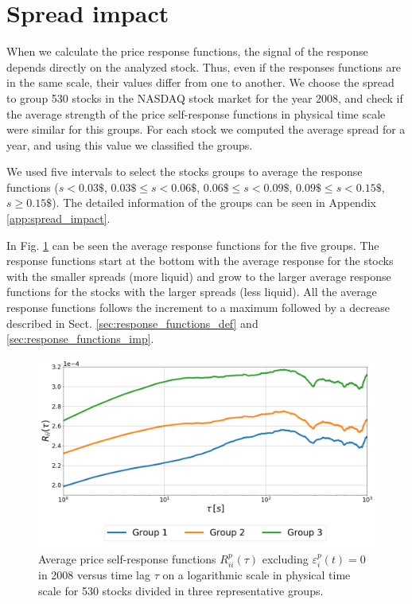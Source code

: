 \section{Spread impact}\label{sec:spread_impact}

When we calculate the price response functions, the signal of the response depends
directly on the analyzed stock. Thus, even if the responses functions are in
the same scale, their values differ from one to another. We choose the spread
to group 530 stocks in the NASDAQ stock market for the year 2008, and check if
the average strength of the price self-response functions in physical time scale were
similar for this groups. For each stock we computed the average spread for a
year, and using this value we classified the groups.

We used five intervals to select the stocks groups to average the response
functions ($s<0.03\$$, $0.03\$ \le s <0.06\$$, $0.06\$ \le s <0.09\$$,
$0.09\$ \le s <0.15\$$, $s \ge 0.15\$$). The detailed information of the groups
can be seen in Appendix \ref{app:spread_impact}.

In Fig. \ref{fig:spread_impact} can be seen the average response functions for
the five groups. The response functions start at the bottom with the average
response for the stocks with the smaller spreads (more liquid) and grow to the
larger average response functions for the stocks with the larger spreads (less
liquid). All the average response functions follows the increment to a maximum
followed by a decrease described in Sect. \ref{sec:response_functions_def} and
\ref{sec:response_functions_imp}.

\begin{figure}[htbp]
    \centering
    \includegraphics[width=\columnwidth]{figures/06_spread_impact_2008.png}
    \caption{Average price self-response functions
             $R^{p}_{ii}\left(\tau\right)$ excluding
             $\varepsilon^{p}_{i}\left(t\right) = 0$ in 2008 versus time lag
             $\tau$ on a logarithmic scale in physical time scale for 530
             stocks divided in three representative groups.}
    \label{fig:spread_impact}
\end{figure}

